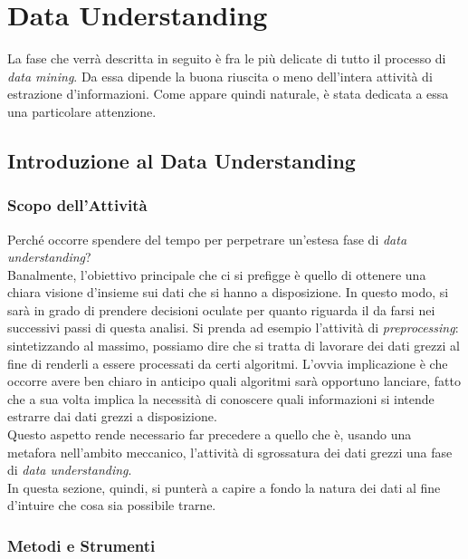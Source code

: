 \chapter{Data Understanding}

La fase che verrà descritta in seguito è fra le più delicate di tutto il processo di \textit{data mining}. Da essa dipende la buona riuscita o meno dell'intera attività di estrazione d'informazioni. Come appare quindi naturale, è stata dedicata a essa una particolare attenzione.

\section{Introduzione al Data Understanding}

\subsection{Scopo dell'Attività}

Perché occorre spendere del tempo per perpetrare un'estesa fase di \textit{data understanding}? \\

Banalmente, l'obiettivo principale che ci si prefigge è quello di ottenere una chiara visione d'insieme sui dati che si hanno a disposizione. In questo modo, si sarà in grado di prendere decisioni oculate per quanto riguarda il da farsi nei successivi passi di questa analisi. Si prenda ad esempio l'attività di \textit{preprocessing}: sintetizzando al massimo, possiamo dire che si tratta di lavorare dei dati grezzi al fine di renderli a essere processati da certi algoritmi. L'ovvia implicazione è che occorre avere ben chiaro in anticipo quali algoritmi sarà opportuno lanciare, fatto che a sua volta implica la necessità di conoscere quali informazioni si intende estrarre dai dati grezzi a disposizione. \\

Questo aspetto rende necessario far precedere a quello che è, usando una metafora nell'ambito meccanico, l'attività di sgrossatura dei dati grezzi una fase di \textit{data understanding}. \\

In questa sezione, quindi, si punterà a capire a fondo la natura dei dati al fine d'intuire che cosa sia possibile trarne.

\subsection{Metodi e Strumenti}

